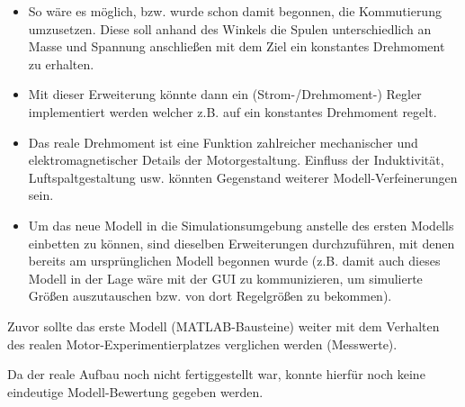 \begin{itemize}
	\item So wäre es möglich, bzw. wurde schon damit begonnen, die Kommutierung umzusetzen. Diese soll anhand des Winkels die Spulen unterschiedlich an Masse und Spannung anschließen mit dem Ziel ein konstantes Drehmoment zu erhalten.
	
	\item Mit dieser Erweiterung könnte dann ein (Strom-/Drehmoment-) Regler implementiert werden welcher z.B. auf ein konstantes Drehmoment regelt.
	
	\item Das reale Drehmoment ist eine Funktion zahlreicher mechanischer und elektromagnetischer Details der Motorgestaltung. Einfluss der Induktivität, Luftspaltgestaltung usw. könnten Gegenstand weiterer Modell-Verfeinerungen sein. 
	
	\item Um das neue Modell in die Simulationsumgebung anstelle des ersten Modells einbetten zu können, sind dieselben Erweiterungen durchzuführen, mit denen bereits am ursprünglichen Modell begonnen wurde (z.B. damit auch dieses Modell in der Lage wäre mit der GUI zu kommunizieren, um simulierte Größen auszutauschen bzw. von dort Regelgrößen zu bekommen).
\end{itemize}

Zuvor sollte das erste Modell (MATLAB-Bausteine) weiter mit dem Verhalten des realen Motor-Experimentierplatzes verglichen werden (Messwerte). 

Da der reale Aufbau noch nicht fertiggestellt war, konnte hierfür noch keine eindeutige Modell-Bewertung gegeben werden.

